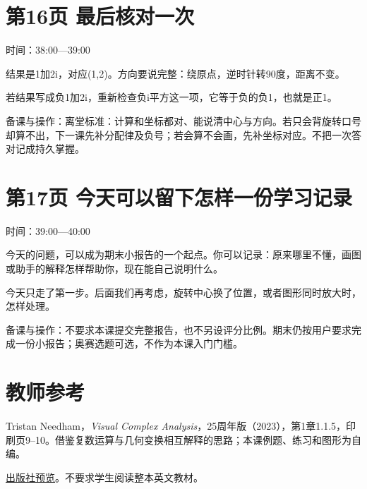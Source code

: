 \documentclass[UTF8,a4paper,11pt,fontset=fandol]{ctexart}
\begin{document}
\par\noindent\begin{minipage}{\linewidth}

\section*{第16页 最后核对一次}

时间：38:00—39:00

结果是1加2i，对应(1,2)。方向要说完整：绕原点，逆时针转90度，距离不变。

若结果写成负1加2i，重新检查负i平方这一项，它等于负的负1，也就是正1。

{\small\color{black!65}备课与操作：离堂标准：计算和坐标都对、能说清中心与方向。若只会背旋转口号却算不出，下一课先补分配律及负号；若会算不会画，先补坐标对应。不把一次答对记成持久掌握。}

\end{minipage}\par\vspace{3mm}

\par\noindent\begin{minipage}{\linewidth}

\section*{第17页 今天可以留下怎样一份学习记录}

时间：39:00—40:00

今天的问题，可以成为期末小报告的一个起点。你可以记录：原来哪里不懂，画图或助手的解释怎样帮助你，现在能自己说明什么。

今天只走了第一步。后面我们再考虑，旋转中心换了位置，或者图形同时放大时，怎样处理。

{\small\color{black!65}备课与操作：不要求本课提交完整报告，也不另设评分比例。期末仍按用户要求完成一份小报告；奥赛选题可选，不作为本课入门门槛。}

\end{minipage}\par\vspace{3mm}

\section*{教师参考}

Tristan Needham，\textit{Visual Complex Analysis}，25周年版（2023），第1章1.1.5，印刷页9--10。借鉴复数运算与几何变换相互解释的思路；本课例题、练习和图形为自编。

\href{https://api.pageplace.de/preview/DT0400.9780192695451_A46510629/preview-9780192695451_A46510629.pdf}{出版社预览}。不要求学生阅读整本英文教材。
\end{document}
